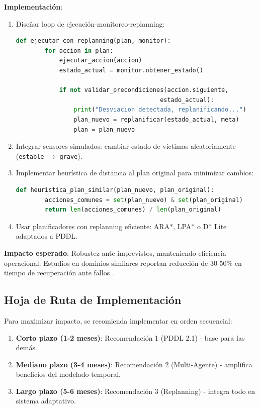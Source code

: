 \documentclass[conference]{IEEEtran}
\begin{document}
    \textbf{Implementación}:
    \begin{enumerate}[leftmargin=*,itemsep=1pt]
    \item Diseñar loop de ejecución-monitoreo-replanning:
    \begin{lstlisting}[language=Python]
    def ejecutar_con_replanning(plan, monitor):
        for accion in plan:
            ejecutar_accion(accion)
            estado_actual = monitor.obtener_estado()
            
            if not validar_precondiciones(accion.siguiente, 
                                        estado_actual):
                print("Desviacion detectada, replanificando...")
                plan_nuevo = replanificar(estado_actual, meta)
                plan = plan_nuevo
    \end{lstlisting}
    \item Integrar sensores simulados: cambiar estado de víctimas aleatoriamente (\texttt{estable} $\to$ \texttt{grave}).
    \item Implementar heurística de distancia al plan original para minimizar cambios:
    \begin{lstlisting}[language=Python]
    def heuristica_plan_similar(plan_nuevo, plan_original):
        acciones_comunes = set(plan_nuevo) & set(plan_original)
        return len(acciones_comunes) / len(plan_original)
    \end{lstlisting}
    \item Usar planificadores con replanning eficiente: ARA*, LPA* o D* Lite adaptados a PDDL.
    \end{enumerate}

    \textbf{Impacto esperado}: Robustez ante imprevistos, manteniendo eficiencia operacional. Estudios en dominios similares reportan reducción de 30-50\% en tiempo de recuperación ante fallos \cite{fox2003pddl}.

    \subsection{Hoja de Ruta de Implementación}

    Para maximizar impacto, se recomienda implementar en orden secuencial:
    \begin{enumerate}
    \item \textbf{Corto plazo (1-2 meses)}: Recomendación 1 (PDDL 2.1) - base para las demás.
    \item \textbf{Mediano plazo (3-4 meses)}: Recomendación 2 (Multi-Agente) - amplifica beneficios del modelado temporal.
    \item \textbf{Largo plazo (5-6 meses)}: Recomendación 3 (Replanning) - integra todo en sistema adaptativo.
    \end{enumerate}
\end{document}

